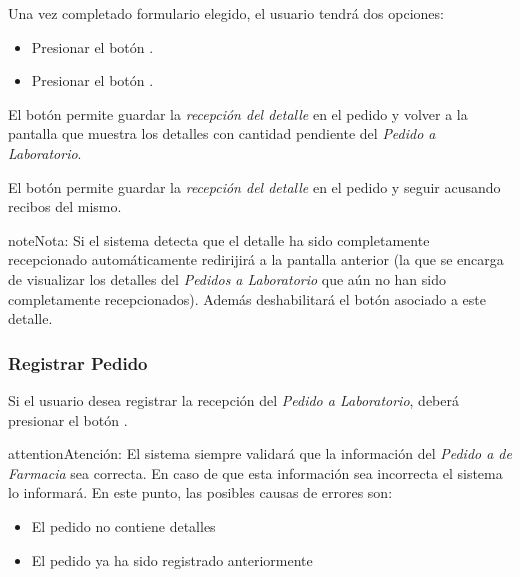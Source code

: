\documentclass[a4paper,10pt,spanish]{sphinxmanual}
\begin{document}
Una vez completado formulario elegido, el usuario tendrá dos opciones:
\begin{itemize}
\item {} 
Presionar el botón .

\item {} 
Presionar el botón .

\end{itemize}

El botón  permite guardar la \emph{recepción del detalle} en el pedido y volver a la pantalla que muestra los detalles con cantidad pendiente del \emph{Pedido a Laboratorio}.

El botón  permite guardar la \emph{recepción del detalle} en el pedido y seguir acusando recibos del mismo.

\begin{notice}{note}{Nota:}
Si el sistema detecta que el detalle ha sido completamente recepcionado automáticamente redirijirá a la pantalla anterior (la que se encarga de visualizar los detalles del \emph{Pedidos a Laboratorio} que aún no han sido completamente recepcionados). Además deshabilitará el botón  asociado a este detalle.
\end{notice}


\subsubsection{Registrar Pedido}
\label{receppedidosdelab:registrar-pedido-rpl}\label{receppedidosdelab:registrar-pedido}
Si el usuario desea registrar la recepción del \emph{Pedido a Laboratorio}, deberá presionar el botón .


\begin{notice}{attention}{Atención:}
El sistema siempre validará que la información del \emph{Pedido a de Farmacia} sea correcta. En caso de que esta información sea incorrecta el sistema lo informará.
En este punto, las posibles causas de errores son:
\begin{itemize}
\item {} 
El pedido no contiene detalles

\item {} 
El pedido ya ha sido registrado anteriormente

\end{itemize}
\end{notice}
\end{document}

